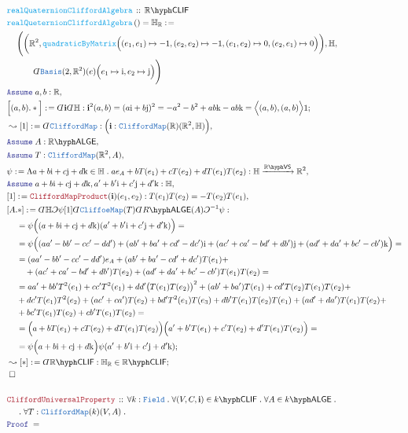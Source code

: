 \documentclass[12pt]{scrartcl}%
\newcommand{\TYPE}[1]{\textcolor{NavyBlue}{\mathtt{#1}}}%
\newcommand{\FUNC}[1]{\textcolor{Cerulean}{\mathtt{#1}}}%
\newcommand{\LOGIC}[1]{\textcolor{Blue}{\mathtt{#1}}}%
\newcommand{\THM}[1]{\textcolor{Maroon}{\mathtt{#1}}}%
\renewcommand{\.}{\; . \;} %
\newcommand{\de}{: \kern 0.1pc =} %
\newcommand{\Act}[1]{\left( #1 \right)} %
\newcommand{\Theorem}[2]{& \THM{#1} \, :: \, #2 \\ & \Proof = \\ } %
\newcommand{\DeclareFunc}[2]{& \FUNC{#1} \, :: \, #2 \\}%
\newcommand{\DefineNamedFunc}[4]{&  \FUNC{#1}\Act{#2} = #3 \de #4 \\}%
\newcommand{\NewLine}{\\ & \kern 1pc}%
\newcommand{\Page}[1]{ \begin{align*} #1 \end{align*}  }%
\newcommand{ \bd }{ \ByDef }%
\newcommand{\Reals}{\mathbb{R}}%
\newcommand{\Quat}{\mathbb{H}}%
\newcommand{\Say}[3]{& #1 \de #2 : #3, \\} %
\newcommand{\Conclude}[3]{& #1 \de #2 : #3; \\}%
\newcommand{\Derive}[3]{& \leadsto #1 \de #2 : #3, \\} %
\newcommand{\DeriveConclude}[3]{& \leadsto #1 \de #2 : #3 ; \\} %
\newcommand{\Assume}[2]{& \LOGIC{Assume} \; #1 : #2, \\} %
\newcommand{\QED}{\; \square} %
\newcommand{\EndProof}{& \QED \\} %
\newcommand{\ByDef}{\rotatebox[origin=c]{-180}{$D$}}%
\newcommand{\ByConstr}{\rotatebox[origin=c]{-180}{$C$}}%
\newcommand{\Proof}{\LOGIC{Proof} \; } %
\newcommand{\Arrow}[1]{\xrightarrow{#1}}%
\newcommand{\Basis}{\TYPE{Basis}} %
\newcommand{\VS}[1]{#1\hyph\mathsf{VS}} %
\newcommand{\Field}{\TYPE{Field}}
\newcommand{\LALGE}[1]{#1\hyph\mathsf{ALGE}}%
\newcommand{\CLIF}[1]{#1\hyph\mathsf{CLIF}}%
\begin{document}
\Page{
	\DeclareFunc{realQuaternionCliffordAlgebra}{\CLIF{\Reals}}
	\DefineNamedFunc{realQueternionCliffordAlgebra}{}{\Quat_\Reals}{
		\NewLine \Bigg( 
			\bigg(\Reals^2 , \FUNC{quadraticByMatrix}\Big( (e_1,e_1)\mapsto -1, (e_2,e_2) \mapsto -1, 
			 (e_1,e_2) \mapsto 0, (e_2,e_1) \mapsto 0  \Big) \bigg) , 
			\Quat, \NewLine \quad\quad \bd \Basis(2,\Reals^2)(e)\Big( e_1 \mapsto \mathrm{i}, e_2 \mapsto \mathrm{j}  \Big)
		\Bigg)
	}
	\Assume{a,b}{\Reals}
	\Conclude{\Big[(a,b).*\Big]}{ \bd \mathbf{i}\bd \Quat}
	{
		\mathbf{i}^2(a,b) =
		(a\mathrm{i} + b\mathrm{j})^2 =
		-a^2 - b^2 + ab\mathrm{k} - ab\mathrm{k} = 
		\Big\langle (a,b),(a,b) \Big\rangle 1
	}
	\Derive{ [1] }{\bd \TYPE{CliffordMap}}{\Big( \mathbf{i} : \TYPE{CliffordMap}(\Reals)(\Reals^2,\Quat)\Big)} 
	\Assume{A}{\LALGE{\Reals}}
	\Assume{T}{\TYPE{CliffordMap}(\Reals^2,A)}
	\Say{\psi}{\Lambda a + b\mathrm{i} + c\mathrm{j} + d\mathrm{k} \in \Quat \. a e_A + b T(e_1) + c T(e_2) + d T(e_1)T(e_2)}
	{\Quat \Arrow{\VS{\Reals}} \Reals^2 }
	\Assume{a + b\mathrm{i} + c\mathrm{j} + d\mathrm{k},a' + b'\mathrm{i} + c'\mathrm{j} + d'\mathrm{k}}{\Quat}
	\Say{[1]}{\THM{CliffordMapProduct}(\mathbf{i})(e_1,e_2)}{T(e_1)T(e_2) = - T(e_2)T(e_1)}
	\Conclude{[A.*]}{\bd \Quat \ByConstr \psi [1]\bd \TYPE{CliffoeMap}(T)\bd \LALGE{R}(A)\ByConstr^{-1}\psi }
	{
		\NewLine =
		\psi\Big( (a + b\mathrm{i} + c\mathrm{j} + d\mathrm{k})(a' + b'\mathrm{i} + c'\mathrm{j} +d'\mathrm{k} ) \Big) =
		\NewLine =
		\psi\Big( (aa' -bb' - cc' -dd') +(ab' + ba' +cd' -dc')\mathrm{i}   
			+ (ac' + ca' -bd' + db')\mathrm{j} + (ad' + da' + bc' - cb')\mathrm{k}
		\Big)= \NewLine = 
		(aa' -bb' - cc' -dd')e_A +(ab' + ba' -cd' +dc')T(e_1) + \NewLine \quad 
			+ (ac' + ca' -bd' + db')T(e_2) + (ad' + da' + bc' - cb')T(e_1)T(e_2) = \NewLine =
		aa' + bb'T^2(e_1) + cc' T^2(e_1) + dd'\big(T(e_1)T(e_2)\big)^2 +
		(ab' + ba')T(e_1)  + cd'T(e_2)T(e_1)T(e_2) + \NewLine + dc'T(e_1)T^2(e_2) +  
		(ac' + ca')T(e_2)  + bd' T^2(e_1)T(e_3) + db' T(e_1)T(e_2)T(e_1) + 
		(ad' + da')T(e_1)T(e_2) +  \NewLine + bc' T(e_1)T(e_2) + cb'T(e_1)T(e_2) = \NewLine =  
		\Big(a + bT(e_1) + cT(e_2) + dT(e_1)T(e_2)\Big)\Big(a' + b'T(e_1) + c'T(e_2) + d'T(e_1)T(e_2)\Big) = \NewLine =
		\psi\Big( a + b\mathrm{i} + c\mathrm{j} + d\mathrm{k}\Big)\psi(a' + b'\mathrm{i} +c'\mathrm{j} +d'\mathrm{k})
	}
	\DeriveConclude{[*]}{\bd \CLIF{\Reals}}{\Quat_\Reals \in \CLIF{\Reals}}
	\EndProof
	\\
	\Theorem{CliffordUniversalProperty}
	{
		\forall k : \Field \.
		\forall (V,C,\mathbf{i}) \in \CLIF{k} \.
		\forall A \in \LALGE{k} \. \NewLine \. 
		\forall T : \TYPE{CliffordMap}(k)(V,A) \.
}}
\end{document}
